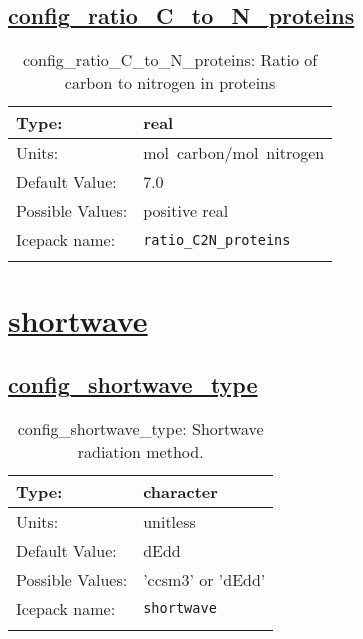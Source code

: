 \subsection[config\_ratio\_C\_to\_N\_proteins]{\hyperref[sec:nm_tab_biogeochemistry]{config\_ratio\_C\_to\_N\_proteins}}
\label{subsec:nm_sec_config_ratio_C_to_N_proteins}
\begin{center}
\begin{longtable}{| p{2.0in} || p{4.0in} |}
    \hline
    Type: & real \\
    \hline
    Units: & \si{mol.carbon/mol.nitrogen} \\
    \hline
    Default Value: & 7.0 \\
    \hline
    Possible Values: & positive real \\
    \hline
    \hline
    Icepack name: & \verb+ratio_C2N_proteins+ \\
    \caption{config\_ratio\_C\_to\_N\_proteins: Ratio of carbon to nitrogen in proteins}
\end{longtable}
\end{center}
\section[shortwave]{\hyperref[sec:nm_tab_shortwave]{shortwave}}
\label{sec:nm_sec_shortwave}
\subsection[config\_shortwave\_type]{\hyperref[sec:nm_tab_shortwave]{config\_shortwave\_type}}
\label{subsec:nm_sec_config_shortwave_type}
\begin{center}
\begin{longtable}{| p{2.0in} || p{4.0in} |}
    \hline
    Type: & character \\
    \hline
    Units: & \si{unitless} \\
    \hline
    Default Value: & dEdd \\
    \hline
    Possible Values: & 'ccsm3' or 'dEdd' \\
    \hline
    \hline
    Icepack name: & \verb+shortwave+ \\
    \caption{config\_shortwave\_type: Shortwave radiation method.}
\end{longtable}
\end{center}
